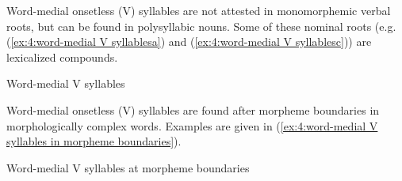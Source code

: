 Word-medial onsetless (V) syllables are not attested in monomorphemic verbal roots, but can be found in polysyllabic nouns. Some of these nominal roots (e.g. (\ref{ex:4:word-medial V syllablesa}) and (\ref{ex:4:word-medial V syllablesc})) are lexicalized compounds.

\ea\label{ex:4:word-medial V syllables}
{Word-medial V syllables}
    \label{ex:4:word-medial V syllablesa}
        \label{ex:4:word-medial V syllablesb}
            \label{ex:4:word-medial V syllablesc}
                \label{ex:4:word-medial V syllablesd}
    \z
\z

Word-medial onsetless (V) syllables are found after morpheme boundaries in morphologically complex words. Examples are given in (\ref{ex:4:word-medial V syllables in morpheme boundaries}).

\ea\label{ex:4:word-medial V syllables in morpheme boundaries}
{Word-medial V syllables at morpheme boundaries}

